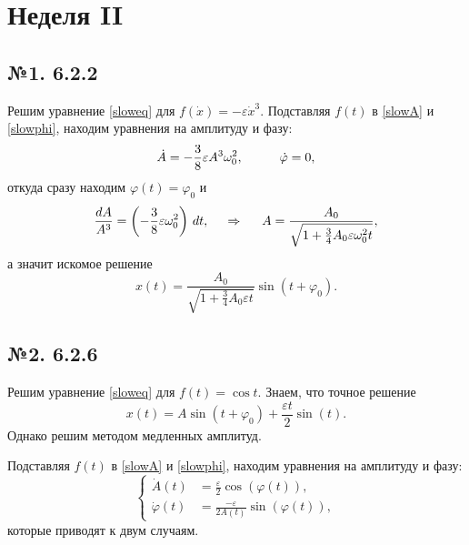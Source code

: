 \section{Неделя II}


\subsection*{№1. 6.2.2}

Решим уравнение \eqref{sloweq} для $f(\dot{x}) = -\varepsilon \dot{x}^3$. Подставляя $f(t)$ в \eqref{slowA} и \eqref{slowphi}, находим
уравнения на амплитуду и фазу:
\begin{align*}
    \dot{A} = - \frac{3}{8} \varepsilon A^3 \omega_0^2,
    \hspace{10 mm} 
    \dot{\varphi} = 0,
\end{align*}
откуда сразу находим $\varphi(t) = \varphi_0$ и
\begin{equation*}
    \frac{d A}{A^3} = \left(- \frac{3}{8} \varepsilon \omega_0^2\right) \, d t,
    \hspace{0.5cm} \Rightarrow \hspace{0.5cm}
    A = \frac{A_0}{\sqrt{1 + \frac{3}{4} A_0 \varepsilon \omega_0^2 t}},
\end{equation*}
а значит искомое решение
\begin{equation*}
    x(t) = \frac{A_0}{\sqrt{1 + \frac{3}{4} A_0 \varepsilon t}} \sin(t + \varphi_0).
\end{equation*}



\subsection*{№2. 6.2.6}

Решим уравнение \eqref{sloweq} для $f(t) = \cos t$. Знаем, что точное решение 
\begin{equation*}
    x(t) = A \sin(t + \varphi_0) + \frac{\varepsilon t}{2} \sin(t).
\end{equation*}
Однако решим методом медленных амплитуд.

Подставляя $f(t)$ в \eqref{slowA} и \eqref{slowphi}, находим
уравнения на амплитуду и фазу:
\begin{equation*}
    \left\{\begin{aligned}
        \dot{A}(t) &= \tfrac{\varepsilon}{2} \cos(\varphi(t)), \\
        \dot{\varphi}(t) &= \tfrac{-\varepsilon}{2 A(t)} \sin(\varphi(t)),
    \end{aligned}\right.
\end{equation*}
которые приводят к двум случаям.

